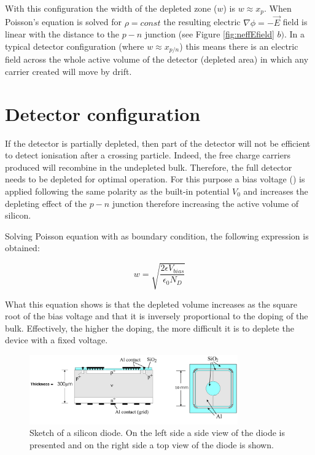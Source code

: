 With this configuration the width of the depleted zone ($w$) is $w \approx x_p$.
When Poisson's equation is solved for $\rho = const$ the resulting electric
$\nabla \phi = -\overrightarrow {E}$ field is linear with the distance to the $p-n$
junction (see Figure \ref{fig:neffEfield} $b)$. In a typical detector configuration (where $w \approx x_{p/n}$) this
means there is an electric field across the whole active volume of the detector
(depleted area) in which any carrier created will move by drift. 


\section{Detector configuration}
\label{sec:detConfig}

If the detector is partially depleted, then part of the detector will not be
efficient to detect ionisation after a crossing particle. Indeed, the free
charge carriers produced will recombine in the undepleted bulk. Therefore, the
full detector needs to be depleted for optimal operation. For this purpose a
bias voltage (\vias) is applied following the same polarity as the built-in
potential $V_0$ and increases the depleting effect of the $p-n$ junction
therefore increasing the active volume of silicon. 

Solving Poisson equation with \vias as boundary condition, the following
expression is obtained: 

\begin{equation}
w = \sqrt{\frac{2\epsilon V_{bias}}{\epsilon_0 N_D}}
\label{eq:widthVias}
\end{equation}

What this equation shows is that the depleted volume increases as the square
root of the bias voltage and that it is inversely proportional to the doping of the
bulk. Effectively, the higher the doping, the more difficult it is to deplete the
device with a fixed voltage. 

\begin{figure}[H]
	\centering
	\includegraphics[width=0.8\textwidth]{diode_si.png}
	\caption{Sketch of a silicon diode. On the left side a side view of the diode is presented and on the right side a top view of the diode is shown.}
	\label{fig:diodeSi}
\end{figure}

